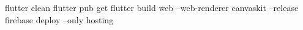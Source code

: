 flutter clean
flutter pub get
flutter build web --web-renderer canvaskit --release
firebase deploy --only hosting

